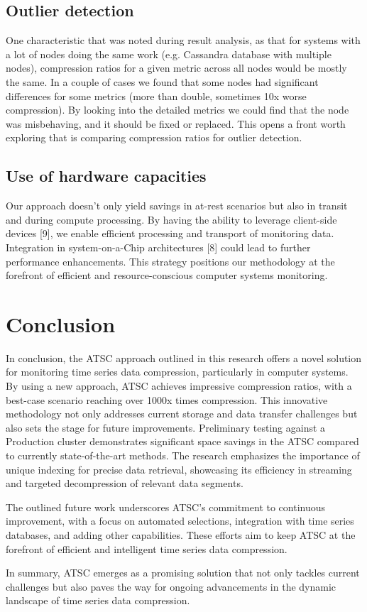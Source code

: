 \documentclass[conference]{IEEEtran}
\begin{document}
\subsection{Outlier detection}

One characteristic that was noted during result analysis, as that for systems with a lot of nodes doing the same work (e.g. Cassandra database with multiple nodes), compression ratios for a given metric across all nodes would be mostly the same.
In a couple of cases we found that some nodes had significant differences for some metrics (more than double, sometimes 10x worse compression). By looking into the detailed metrics we could find that the node was misbehaving, and it should be fixed 
or replaced. This opens a front worth exploring that is comparing compression ratios for outlier detection.

\subsection{Use of hardware capacities}

Our approach doesn't only yield savings in at-rest scenarios but also in transit and during compute processing.
By having the ability to leverage client-side devices [9], we enable efficient processing and transport of monitoring data. 
Integration in system-on-a-Chip architectures [8] could lead to further performance enhancements. 
This strategy positions our methodology at the forefront of efficient and resource-conscious computer systems monitoring.

\section{Conclusion}

In conclusion, the ATSC approach outlined in this research offers a novel solution for monitoring time series data compression, particularly in computer systems. By using a new approach, ATSC achieves impressive compression ratios, with a best-case scenario reaching over 1000x times compression. This innovative methodology not only addresses current storage and data transfer challenges but also sets the stage for future improvements.
\vspace{5pt}
Preliminary testing against a Production cluster demonstrates significant space savings in the ATSC compared to currently state-of-the-art methods. The research emphasizes the importance of unique indexing for precise data retrieval, showcasing its efficiency in streaming and targeted decompression of relevant data segments.

The outlined future work underscores ATSC's commitment to continuous improvement, with a focus on automated selections, integration with time series databases, and adding other capabilities. These efforts aim to keep ATSC at the forefront of efficient and intelligent time series data compression.

In summary, ATSC emerges as a promising solution that not only tackles current challenges but also paves the way for ongoing advancements in the dynamic landscape of time series data compression.

\end{document}

